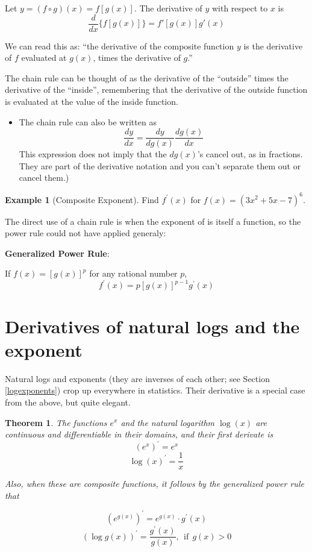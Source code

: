 \documentclass[
]{book}
\providecommand{\tightlist}{%
  \setlength{\itemsep}{0pt}\setlength{\parskip}{0pt}}
\newtheorem{theorem}{Theorem}[chapter]
\theoremstyle{definition}
\theoremstyle{definition}
\newtheorem{example}{Example}[chapter]
\theoremstyle{definition}
\theoremstyle{definition}
\theoremstyle{remark}
\begin{document}
Let \(y=(f\circ g)(x)= f[g(x)]\). The derivative of \(y\) with respect to \(x\) is \[\frac{d}{dx} \{ f[g(x)] \} = f'[g(x)] g'(x)\]

We can read this as: ``the derivative of the composite function \(y\) is the derivative of \(f\) evaluated at \(g(x)\), times the derivative of \(g\).''

The chain rule can be thought of as the derivative of the ``outside'' times the derivative of the ``inside'', remembering that the derivative of the outside function is evaluated at the value of the inside function.

\begin{itemize}
\tightlist
\item
  The chain rule can also be written as \[\frac{dy}{dx}=\frac{dy}{dg(x)} \frac{dg(x)}{dx}\] This expression does not imply that the \(dg(x)\)'s cancel out, as in fractions. They are part of the derivative notation and you can't separate them out or cancel them.)
\end{itemize}

\begin{example}[Composite Exponent]
\protect\hypertarget{exm:tothesix}{}{\label{exm:tothesix} {} }Find \(f^\prime(x)\) for \(f(x) = (3x^2+5x-7)^6\).
\end{example}

The direct use of a chain rule is when the exponent of is itself a function, so the power rule could not have applied generaly:

\textbf{Generalized Power Rule}:

If \(f(x)=[g(x)]^p\) for any rational number \(p\), \[f^\prime(x) =p[g(x)]^{p-1}g^\prime(x)\]

\hypertarget{derivatives-of-natural-logs-and-the-exponent}{%
\section{Derivatives of natural logs and the exponent}\label{derivatives-of-natural-logs-and-the-exponent}}

Natural logs and exponents (they are inverses of each other; see Section \ref{logexponents}) crop up everywhere in statistics. Their derivative is a special case from the above, but quite elegant.

\begin{theorem}
\protect\hypertarget{thm:derivexplog}{}{\label{thm:derivexplog} }
The functions \(e^x\) and the natural logarithm \(\log(x)\) are continuous and differentiable in their domains, and their first derivate is
\[(e^x)^\prime = e^x\]
\[\log(x)^\prime = \frac{1}{x}\]

Also, when these are composite functions, it follows by the generalized power rule that

\[\left(e^{g(x)}\right)^\prime = e^{g(x)} \cdot g^\prime(x)\]
\[\left(\log g(x)\right)^\prime = \frac{g^\prime(x)}{g(x)}, ~~\text{if}~~ g(x) > 0\]
\end{theorem}
\end{document}
